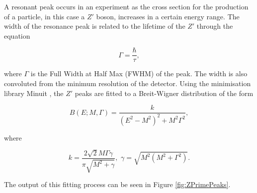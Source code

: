 \documentclass{article}
\begin{document}
A resonant peak occurs in an experiment as the cross section for the production of a particle, in this case a $Z'$ boson, increases in a certain energy range. The width of the resonance peak is related to the lifetime of the $Z'$ through the equation 

\begin{equation}
\Gamma = \frac{\hbar}{\tau},
\end{equation}

where $\Gamma$ is the Full Width at Half Max (FWHM) of the peak. The width is also convoluted from the minimum resolution of the detector.
Using the minimisation library Minuit \cite{Minuit}, the $Z'$ peaks are fitted to a Breit-Wigner distribution of the form

\begin{equation}
B(E;M,\Gamma) = \frac{k}{(E^2 - M^2)^2 + M^2\Gamma^2},
\end{equation}

where 

\begin{equation}
k = \frac{2\sqrt{2}M\Gamma\gamma}{\pi\sqrt{M^2 + \gamma}}, \,\, \gamma = \sqrt{M^2(M^2 + \Gamma^2)}.
\end{equation}

The output of this fitting process can be seen in Figure \ref{fig:ZPrimePeaks}.
\end{document}
